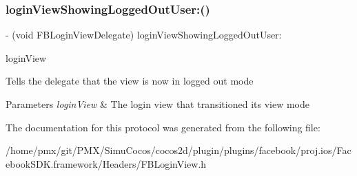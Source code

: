 \subsubsection{\texorpdfstring{login\+View\+Showing\+Logged\+Out\+User\+:()}{loginViewShowingLoggedOutUser:()}\hspace{0.1cm}{\footnotesize\ttfamily [5/5]}}
{\footnotesize\ttfamily -\/ (void F\+B\+Login\+View\+Delegate) login\+View\+Showing\+Logged\+Out\+User\+: \begin{DoxyParamCaption}\item[{(\hyperlink{interfaceFBLoginView}{F\+B\+Login\+View} $\ast$)}]{login\+View }\end{DoxyParamCaption}\hspace{0.3cm}{\ttfamily [optional]}}

Tells the delegate that the view is now in logged out mode


\begin{DoxyParams}{Parameters}
{\em login\+View} & The login view that transitioned its view mode \\
\hline
\end{DoxyParams}


The documentation for this protocol was generated from the following file\+:\begin{DoxyCompactItemize}
\item 
/home/pmx/git/\+P\+M\+X/\+Simu\+Cocos/cocos2d/plugin/plugins/facebook/proj.\+ios/\+Facebook\+S\+D\+K.\+framework/\+Headers/F\+B\+Login\+View.\+h\end{DoxyCompactItemize}
